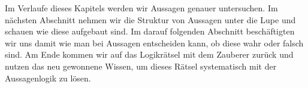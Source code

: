 \documentclass[../../main.tex]{subfiles}
\begin{document}
    Im Verlaufe dieses Kapitels werden wir Aussagen genauer untersuchen. Im nächsten Abschnitt nehmen wir die Struktur von Aussagen unter die Lupe und schauen wie diese aufgebaut sind. Im darauf folgenden Abschnitt beschäftigten wir uns damit wie man bei Aussagen entscheiden kann, ob diese wahr oder falsch sind. Am Ende kommen wir auf das Logikrätsel mit dem Zauberer zurück und nutzen das neu gewonnene Wissen, um dieses Rätsel systematisch mit der Aussagenlogik zu lösen.

    
        
\end{document}
